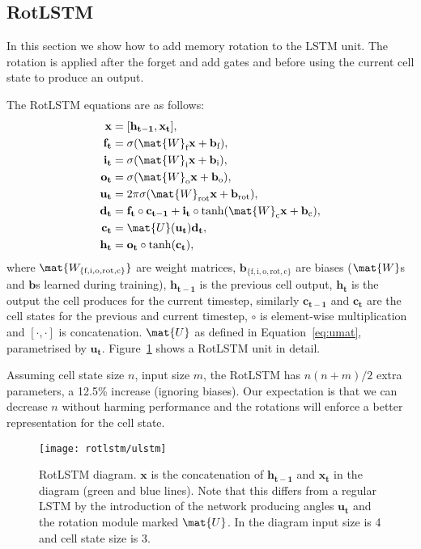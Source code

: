 \documentclass{article}
\begin{document}
\subsection{RotLSTM}

In this section we show how to add memory rotation to the LSTM unit. The rotation is applied after the forget and add gates and before using the current cell state to produce an output.

The RotLSTM equations are as follows:
\begin{align}
	\mathbf{x} &= [\mathbf{h_{t-1}},  \mathbf{x_t}], \\
	\mathbf{f_t} &= \sigma(\mat{W}_{\text{f}} \mathbf{x} + \mathbf{b}_\text{f}), \\
	\mathbf{i_t} &= \sigma(\mat{W}_{\text{i}} \mathbf{x} + \mathbf{b}_\text{i}), \\
	\mathbf{o_t} &= \sigma(\mat{W}_{\text{o}} \mathbf{x} + \mathbf{b}_\text{o}), \\
	\mathbf{u_t} &= 2\pi\sigma(\mat{W}_{\text{rot}} \mathbf{x} + \mathbf{b}_\text{rot}), \\
	\mathbf{d_t} &= \mathbf{f_t} \circ \mathbf{c_{t-1}} + \mathbf{i_t} \circ \tanh(\mat{W}_{\text{c}} \mathbf{x} + \mathbf{b}_\text{c}), \\
	\mathbf{c_t} &= \mat{U}(\mathbf{u_t})\mathbf{d_t}, \\
	\mathbf{h_t} &= \mathbf{o_t} \circ \tanh(\mathbf{c_t}),
\end{align}
where $\mat{W_{\{\text{f}, \text{i}, \text{o}, \text{rot}, \text{c}\}}}$ are weight matrices, $\mathbf{b}_{\{\text{f}, \text{i}, \text{o}, \text{rot}, \text{c}\}}$ are biases ($\mat{W}$s and $\mathbf{b}$s learned during training), $\mathbf{h_{t-1}}$ is the previous cell output, $\mathbf{h_t}$ is the output the cell produces for the current timestep, similarly $\mathbf{c_{t-1}}$ and $\mathbf{c_t}$ are the cell states for the previous and current timestep, $\circ$ is element-wise multiplication and $[\cdot, \cdot]$ is concatenation. $\mat{U}$ as defined in Equation~\ref{eq:umat}, parametrised by $\mathbf{u_t}$. Figure~\ref{fig:RotLSTM} shows a RotLSTM unit in detail.

Assuming cell state size $n$, input size $m$, the RotLSTM has $n(n+m)/2$ extra parameters, a 12.5\% increase (ignoring biases). Our expectation is that we can decrease $n$ without harming performance and the rotations will enforce a better representation for the cell state.

\begin{figure}[ht]
\centering
\texttt{[image: rotlstm/ulstm]}
\caption[RotLSTM unit diagram]{RotLSTM diagram. $\mathbf{x}$ is the concatenation of $\mathbf{h_{t-1}}$ and $\mathbf{x_t}$ in the diagram (green and blue lines). Note that this differs from a regular LSTM by the introduction of the network producing angles $\mathbf{u_t}$ and the rotation module marked $\mat{U}$. In the diagram input size is 4 and cell state size is 3.}
\label{fig:RotLSTM}
\end{figure}
\end{document}
